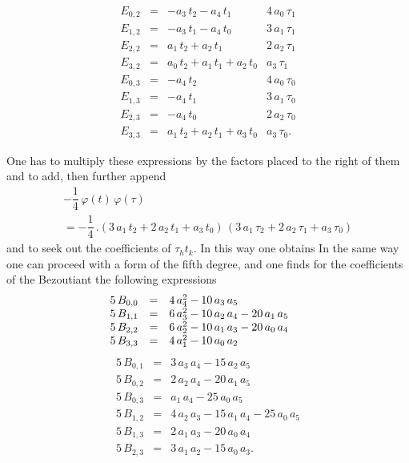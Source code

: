 

\[
\begin{array}{rcl|r}
E_{0,2} &=& - a_3\,t_2 - a_4\,t_1 & 4\,a_0\,\tau_1 \\
E_{1,2} &=& - a_3\,t_1 - a_4\,t_0 & 3\,a_1\,\tau_1 \\
E_{2,2} &=& a_1\,t_2 + a_2\,t_1 & 2\,a_2\,\tau_1 \\
E_{3,2} &=& a_0\,t_2 + a_1\,t_1 + a_2\,t_0 & a_3\,\tau_1 \\
\hline
E_{0,3} &=& - a_4\,t_2 & 4\,a_0\,\tau_0 \\
E_{1,3} &=& - a_4\,t_1 & 3\,a_1\,\tau_0 \\
E_{2,3} &=& - a_4\,t_0 & 2\,a_2\,\tau_0 \\
E_{3,3} &=& a_1\,t_2 + a_2\,t_1 + a_3\,t_0 & a_3\,\tau_0.
\end{array}
\]

One has to multiply these expressions by the factors placed
to the right of them and to add, then further append
\[
\begin{array}{r}
-\dfrac{1}{4}\,\varphi(t)\,\varphi(\tau) \\[1ex]
= -\dfrac{1}{4}\,.(3\,a_1\,t_2 + 2\,a_2\,t_1 + a_3\,t_0)\,(3\,a_1\,\tau_2 + 2\,a_2\,\tau_1 + a_3\,\tau_0)
\end{array}
\]
and to seek out the coefficients of $\tau_h t_k$. In this way
one obtains
In the same way one can proceed with a form of the fifth
degree, and one finds for the coefficients of the Bezoutiant the following expressions
\[
\begin{array}{rcl@{\qquad}rcl}
5\,B_{0,0} &=& 4\,a_4^2 - 10\,a_3\,a_5 \\
5\,B_{1,1} &=& 6\,a_3^2 - 10\,a_2\,a_4 - 20\,a_1\,a_5 \\
5\,B_{2,2} &=& 6\,a_2^2 - 10\,a_1\,a_3 - 20\,a_0\,a_4 \\
5\,B_{3,3} &=& 4\,a_1^2 - 10\,a_0\,a_2 \\
\end{array}
\]
\[
\begin{array}{rcl}
5\,B_{0,1} &=& 3\,a_3\,a_4 - 15\,a_2\,a_5 \\
5\,B_{0,2} &=& 2\,a_2\,a_4 - 20\,a_1\,a_5 \\
5\,B_{0,3} &=& a_1\,a_4 - 25\,a_0\,a_5 \\
5\,B_{1,2} &=& 4\,a_2\,a_3 - 15\,a_1\,a_4 - 25\,a_0\,a_5 \\
5\,B_{1,3} &=& 2\,a_1\,a_3 - 20\,a_0\,a_4 \\
5\,B_{2,3} &=& 3\,a_1\,a_2 - 15\,a_0\,a_3.
\end{array}
\]
